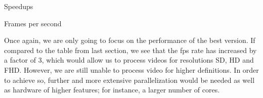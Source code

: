 \documentclass{article}
\begin{document}
\begin{enumerate}[label=5.\arabic*,leftmargin=*]
\begin{table}[h]
    
    \centering
    \caption{Speedups}
\end{table}


\begin{table}[h]
    
    \centering
    \caption{Frames per second}
    \label{fps}
\end{table}

Once again, we are only going to focus on the performance of the best version. If compared to the table from last section, we see that the fps rate has increased by a factor of 3, which would allow us to process videos for resolutions SD, HD and FHD. However, we are still unable to process video for higher definitions. In order to achieve so, further and more extensive parallelization would be needed as well as hardware of higher features; for instance, a larger number of cores.

\end{enumerate}
\end{document}
